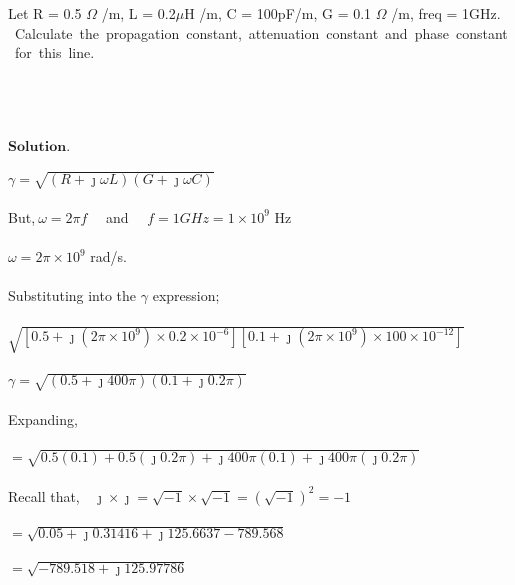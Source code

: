 \begin{exmp}
	Let R = 0.5 $\Omega$ /m, L = 0.2$\mu$H /m, C = 100pF/m, G = 0.1 $\Omega$ /m, freq = 1GHz. \ Calculate\ the\ propagation\ constant,\ attenuation\ constant\ and\ phase\ constant\ for\ this\ line. \\\\\\\\\\
	
	$\textbf{Solution.}$\\\\
	$ \gamma = \sqrt{(R+\jmath\omega L)(G + \jmath\omega C)}$\\\\
	But,$ \ \omega = 2\pi f\quad$ and $\quad f = 1GHz = 1 \times 10^9 $ Hz\\\\
	$ \omega = 2\pi \times 10^9 $ rad/s.\\\\
	Substituting into the $ \gamma $ expression; \\\\
	$\sqrt{[0.5+\jmath (2\pi \times 10^9)\times 0.2 \times 10^{-6}][0.1 + \jmath(2\pi \times 10^9) \times 100 \times10^{-12}]}  $\\\\
	$ \gamma = \sqrt{(0.5 + \jmath 400\pi)(0.1 + \jmath 0.2\pi)} $\\\\
	Expanding,\\\\
	$ = \sqrt{0.5(0.1) + 0.5(\jmath 0.2\pi) + \jmath 400\pi(0.1) + \jmath 400\pi(\jmath 0.2\pi)} $ \\\\
	Recall  that,$ \quad \jmath \times \jmath = \sqrt{-1} \times \sqrt{-1} = (\sqrt{-1})^2 = -1 $\\\\
	$ =\sqrt{0.05 + \jmath 0.31416 +\jmath 125.6637 - 789.568} $ \\\\
	$ = \sqrt{-789.518 + \jmath 125.97786} $ \\


\end{exmp}
